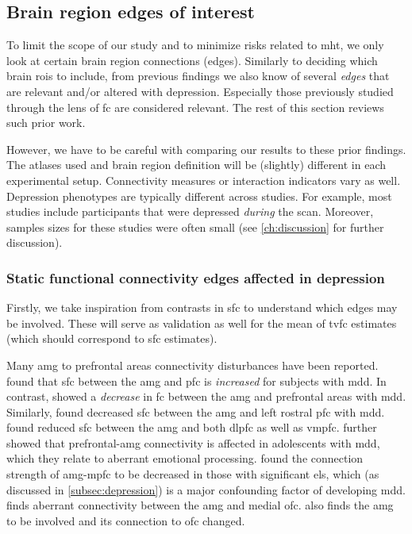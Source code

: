 \subsection{Brain region edges of interest}

To limit the scope of our study and to minimize risks related to \gls{mht}, we only look at certain brain region connections (edges).
Similarly to deciding which brain \glspl{roi} to include, from previous findings we also know of several \emph{edges} that are relevant and/or altered with depression.
Especially those previously studied through the lens of \gls{fc} are considered relevant.
The rest of this section reviews such prior work.

However, we have to be careful with comparing our results to these prior findings.
The atlases used and brain region definition will be (slightly) different in each experimental setup.
Connectivity measures or interaction indicators vary as well.
Depression phenotypes are typically different across studies.
For example, most studies include participants that were depressed \emph{during} the scan.
Moreover, samples sizes for these studies were often small (see \cref{ch:discussion} for further discussion).

\subsubsection{Static functional connectivity edges affected in depression}

Firstly, we take inspiration from contrasts in \gls{sfc} to understand which edges may be involved.
These will serve as validation as well for the mean of \gls{tvfc} estimates (which should correspond to \gls{sfc} estimates).

Many \gls{amg} to prefrontal areas connectivity disturbances have been reported.
\textcite{Zhang2020} found that \gls{sfc} between the \gls{amg} and \gls{pfc} is \emph{increased} for subjects with \gls{mdd}.
In contrast, \textcite{Dannlowski2009} showed a \emph{decrease} in \gls{fc} between the \gls{amg} and prefrontal areas with \gls{mdd}.
Similarly, \textcite{Kong2013} found decreased \gls{sfc} between the \gls{amg} and left rostral \gls{pfc} with \gls{mdd}.
\textcite{Connolly2017} found reduced \gls{sfc} between the \gls{amg} and both \gls{dlpfc} as well as \gls{vmpfc}.
\textcite{Willinger2022} further showed that prefrontal-\gls{amg} connectivity is affected in adolescents with \gls{mdd}, which they relate to aberrant emotional processing.
\textcite{Burghy2012} found the connection strength of \gls{amg}-\gls{mpfc} to be decreased in those with significant \gls{els}, which (as discussed in \cref{subsec:depression}) is a major confounding factor of developing \gls{mdd}.
\textcite{Rolls2020} finds aberrant connectivity between the \gls{amg} and medial \gls{ofc}.
\textcite{Tang2018} also finds the \gls{amg} to be involved and its connection to \gls{ofc} changed.

